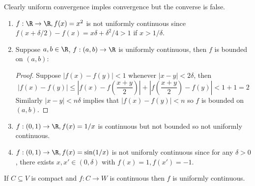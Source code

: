 \documentclass[a4paper]{article}
\theoremstyle{definition}
\begin{document}
Clearly uniform convergence imples convergence but the converse is false.

\begin{eg}\leavevmode
  \begin{enumerate}
  \item \(f: \R \to \R, f(x) = x^2\) is not uniformly continuous since \(f(x + \delta/2) - f(x) = x \delta + \delta^2/4 > 1\) if \(x > 1/\delta\).
  \item Suppose \(a, b \in \R\), \(f: (a, b) \to \R\) is uniformly continuous, then \(f\) is bounded on \((a, b)\):
    \begin{proof}
      Suppose \(|f(x) - f(y)| < 1\) whenever \(|x - y| < 2 \delta\), then
      \[
        |f(x) - f(y)| \leq \left| f(x) - f(\frac{x+y}{2}) \right| + \left| f(\frac{x+y}{2}) - f(y) \right| < 1 + 1 = 2
      \]
      Similarly \(|x - y| < n \delta\) implies that \(|f(x) - f(y)| < n\) so \(f\) is bounded on \((a, b)\).
    \end{proof}
    \item \(f:(0, 1) \to \R, f(x) = 1/x\) is continuous but not bounded so not uniformly continuous.
    \item \(f:(0, 1) \to \R, f(x) = \sin(1/x)\) is not unifornly continuous since for any \(\delta > 0\), there exists \(x, x' \in(0, \delta)\) with \(f(x) = 1, f(x') = -1\).
  \end{enumerate}
\end{eg}

\begin{theorem}
  If \(C \subseteq V\) is compact and \(f: C \to W\) is continuous then \(f\) is uniformly continuous.
\end{theorem}
\end{document}

